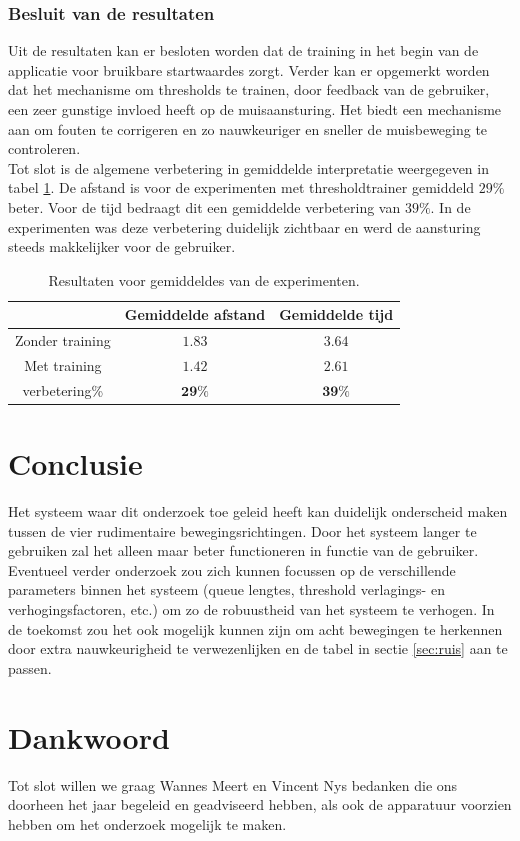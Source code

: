 \documentclass{article}
\begin{document}
\subsubsection*{Besluit van de resultaten}
Uit de resultaten kan er besloten worden dat de training in het begin van de applicatie voor bruikbare startwaardes zorgt. Verder kan er opgemerkt worden dat het mechanisme om thresholds te trainen, door feedback van de gebruiker, een zeer gunstige invloed heeft op de muisaansturing. Het biedt een mechanisme aan om fouten te corrigeren en zo nauwkeuriger en sneller de muisbeweging te controleren.\\
Tot slot is de algemene verbetering in gemiddelde interpretatie weergegeven in tabel \ref{tbl:resgemiddeldes}. De afstand is voor de experimenten met thresholdtrainer gemiddeld $29\%$ beter. Voor de tijd bedraagt dit een gemiddelde verbetering van $39\%$. In de experimenten was deze verbetering duidelijk zichtbaar en werd de aansturing steeds makkelijker voor de gebruiker.
\begin{table}[H]
	\begin{tabular}{|c||c|c|}
		\hline  & \textbf{Gemiddelde afstand} & \textbf{Gemiddelde tijd} \\ 
		\hline Zonder training & $1.83$ &$3.64$\\ 
		\hline Met training  & $1.42$ & $2.61$\\ 
		\hline verbetering\% & $\mathbf{29\%}$  & $\mathbf{39\%}$ \\ 
		\hline 
	\end{tabular} 
	\caption{Resultaten voor gemiddeldes van de experimenten.}
	\label{tbl:resgemiddeldes}
\end{table}
\section{Conclusie}
Het systeem waar dit onderzoek toe geleid heeft kan duidelijk onderscheid maken tussen de vier rudimentaire bewegingsrichtingen. Door het systeem langer te gebruiken zal het alleen maar beter functioneren in functie van de gebruiker. Eventueel verder onderzoek zou zich kunnen focussen op de verschillende parameters binnen het systeem (queue lengtes, threshold verlagings- en verhogingsfactoren,  etc.) om zo de robuustheid van het systeem te verhogen. In de toekomst zou het ook mogelijk kunnen zijn om acht bewegingen te herkennen door extra nauwkeurigheid te verwezenlijken en de tabel in sectie \ref{sec:ruis} aan te passen.

\section{Dankwoord}
Tot slot willen we graag Wannes Meert en Vincent Nys bedanken die ons doorheen het jaar begeleid en geadviseerd hebben, als ook de apparatuur voorzien hebben om het onderzoek mogelijk te maken.


\end{document}
